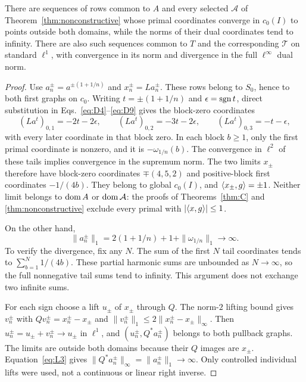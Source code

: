 \begin{proposition}
\label{prop:boundary-sequences}
There are sequences of rows common to $A$ and every selected
$\mathcal A$ of Theorem~\ref{thm:nonconstructive} whose primal
coordinates converge in $c_0(I)$ to points outside both domains,
while the norms of their dual coordinates tend to infinity.
There are also such sequences common to $T$ and the corresponding
$\mathcal T$ on standard $\ell^1$, with convergence in its norm
and divergence in the full $\ell^\infty$ dual norm.
\end{proposition}
\begin{proof}
Use $a_n^\pm=a^{\pm(1+1/n)}$ and $x_n^\pm=La_n^\pm$. These rows
belong to $S_0$, hence to both first graphs on $c_0$.
Writing $t=\pm(1+1/n)$ and $\epsilon=\operatorname{sgn} t$, direct substitution in
Eqs.~\eqref{eq:D4}--\eqref{eq:D9} gives the block-zero coordinates
\[
(La^t)_{0,1}=-2t-2\epsilon,\qquad
(La^t)_{0,2}=-3t-2\epsilon,\qquad
(La^t)_{0,3}=-t-\epsilon,
\]
with every later coordinate in that block zero. In each block $b\ge1$,
only the first primal coordinate is nonzero, and it is
$-\omega_{1/n}(b)$. The convergence in $\ell^2$ of these tails implies
convergence in the supremum norm. The two limits $x_\pm$ therefore have
block-zero coordinates $\mp(4,5,2)$ and positive-block first coordinates
$-1/(4b)$. They belong to global $c_0(I)$, and
$\langle x_\pm,g\rangle=\pm1$. Neither limit belongs to $\operatorname{dom} A$ or
$\operatorname{dom}\mathcal A$: the proofs of Theorems~\ref{thm:C} and
\ref{thm:nonconstructive} exclude every primal with
$|\langle x,g\rangle|\le1$.

On the other hand,
\[
\|a_n^\pm\|_1=2(1+1/n)+1+\|\omega_{1/n}\|_1\longrightarrow\infty.
\]
To verify the divergence, fix any $N$. The sum of the first $N$ tail
coordinates tends to $\sum_{b=1}^N1/(4b)$. These partial harmonic sums
are unbounded as $N\to\infty$, so the full nonnegative tail sums tend
to infinity. This argument does not exchange two infinite sums.

For each sign choose a lift $u_\pm$ of $x_\pm$ through $Q$.
The norm-$2$ lifting bound gives $v_n^\pm$ with
$Qv_n^\pm=x_n^\pm-x_\pm$ and
$\|v_n^\pm\|_1\le2\|x_n^\pm-x_\pm\|_\infty$.
Then $u_n^\pm=u_\pm+v_n^\pm\to u_\pm$ in $\ell^1$, and
$(u_n^\pm,Q^*a_n^\pm)$ belongs to both pullback graphs. The limits
are outside both domains because their $Q$ images are $x_\pm$.
Equation~\eqref{eq:L3} gives
$\|Q^*a_n^\pm\|_\infty=\|a_n^\pm\|_1\to\infty$.
Only controlled individual lifts were used, not a continuous or linear
right inverse.
\end{proof}

